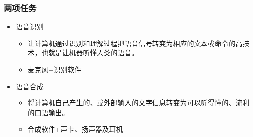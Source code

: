 \documentclass{beamer}
\newcommand{\fullPageImage}[2]{
	{
		\usebackgroundtemplate{\texttt{[image: \#1]}}
		\frame[plain]{#2}
	}
}
\begin{document}
\begin{frame}
	\frametitle{两项任务}
	\beamertemplatetransparentcovereddynamicmedium
	\begin{itemize}[<+->]
		\item 语音识别
		\begin{itemize}
			\item 让计算机通过识别和理解过程把语音信号转变为相应的文本或命令的高技术，也就是让机器听懂人类的语音。
			\item 麦克风+识别软件
		\end{itemize}
		\item 语音合成
		\begin{itemize}
			\item 将计算机自己产生的、或外部输入的文字信息转变为可以听得懂的、流利的口语输出。
			\item 合成软件+声卡、扬声器及耳机
		\end{itemize}
	\end{itemize}
\end{frame}


%
%

\fullPageImage{images/voice-recognition-demo.jpg}{\transwipe}
\fullPageImage{images/voice-recognition-principle.jpg}{\transwipe}%
\end{document}
